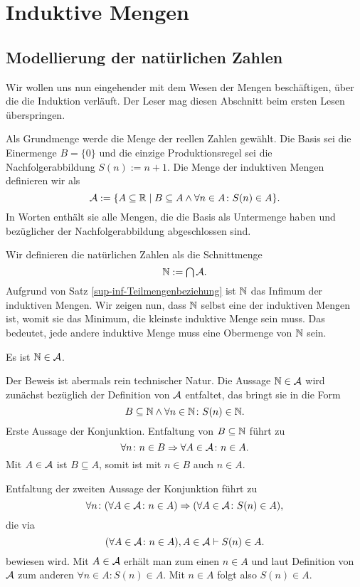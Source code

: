 \section{Induktive Mengen}

\subsection{Modellierung der natürlichen Zahlen}

Wir wollen uns nun eingehender mit dem Wesen der Mengen beschäftigen,
über die die Induktion verläuft. Der Leser mag diesen Abschnitt
beim ersten Lesen überspringen.

Als Grundmenge werde die Menge der reellen Zahlen gewählt. Die Basis sei
die Einermenge $B=\{0\}$ und die einzige Produktionsregel sei die
Nachfolgerabbildung $S(n):=n+1$. Die Menge der induktiven Mengen definieren
wir als
\[\mathcal{A} := \{A\subseteq\mathbb R\mid
B\subseteq A\land\forall n\in A\colon S(n)\in A\}.\]
In Worten enthält sie alle Mengen, die die Basis als Untermenge
haben und bezüglicher der Nachfolgerabbildung abgeschlossen sind.

Wir definieren die natürlichen Zahlen als die Schnittmenge
\[\textstyle\mathbb N := \bigcap\mathcal{A}.\]
Aufgrund von Satz \ref{sup-inf-Teilmengenbeziehung} ist $\mathbb N$ das Infimum
der induktiven Mengen. Wir zeigen nun, dass $\mathbb N$ selbst eine der
induktiven Mengen ist, womit sie das Minimum, die kleinste
induktive Menge sein muss. Das bedeutet, jede andere induktive Menge
muss eine Obermenge von $\mathbb N$ sein.

\begin{Satz}\label{N-is-inductive}
Es ist $\mathbb N\in\mathcal{A}$.
\end{Satz}
\begin{Beweis}
Der Beweis ist abermals rein technischer Natur. Die Aussage
$\mathbb N\in\mathcal{A}$ wird zunächst bezüglich der Definition von
$\mathcal{A}$ entfaltet, das bringt sie in die Form
\[\textstyle B\subseteq\mathbb N\land\forall n\in\mathbb N\colon S(n)\in\mathbb N.\]
Erste Aussage der Konjunktion. Entfaltung von $B\subseteq\mathbb N$ führt zu
\[\forall n\colon n\in B\Rightarrow \forall A\in\mathcal{A}\colon n\in A.\]
Mit $A\in\mathcal{A}$ ist $B\subseteq A$, somit ist mit $n\in B$ auch
$n\in A$.

Entfaltung der zweiten Aussage der Konjunktion führt zu
\[\forall n\colon (\forall A\in\mathcal{A}\colon n\in A)\Rightarrow
(\forall A\in\mathcal{A}\colon S(n)\in A),\]
die via
\[(\forall A\in\mathcal{A}\colon n\in A), A\in\mathcal{A}\vdash S(n)\in A.\]
bewiesen wird. Mit $A\in\mathcal{A}$ erhält man zum einen $n\in A$ und
laut Definition von $\mathcal{A}$ zum anderen $\forall n\in A\colon S(n)\in A$.
Mit $n\in A$ folgt also $S(n)\in A$.\,\qedsymbol
\end{Beweis}

